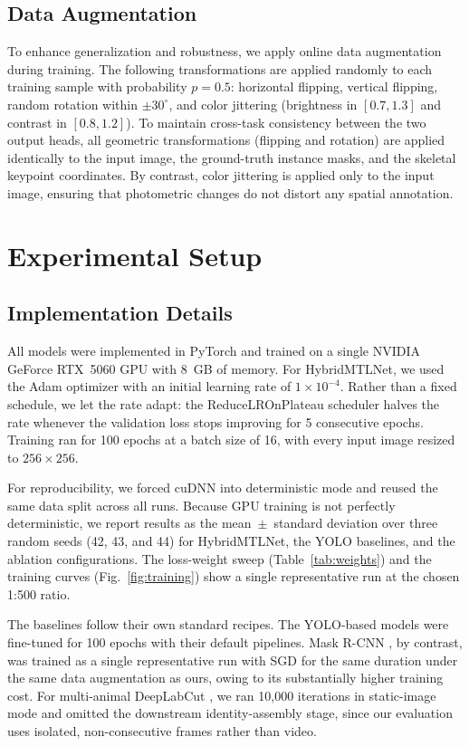\documentclass[runningheads]{llncs}
\begin{document}
\subsection{Data Augmentation}
To enhance generalization and robustness, we apply online data
augmentation during training. The following transformations are applied
randomly to each training sample with probability $p = 0.5$: horizontal
flipping, vertical flipping, random rotation within $\pm 30^\circ$, and
color jittering (brightness in $[0.7, 1.3]$ and contrast in
$[0.8, 1.2]$). To maintain cross-task consistency between the two output
heads, all geometric transformations (flipping and rotation) are applied
identically to the input image, the ground-truth instance masks, and the
skeletal keypoint coordinates. By contrast, color jittering is applied
only to the input image, ensuring that photometric changes do not
distort any spatial annotation.

\section{Experimental Setup}

\subsection{Implementation Details}
All models were implemented in PyTorch and trained on a single NVIDIA
GeForce RTX~5060 GPU with 8~GB of memory. For HybridMTLNet, we used
the Adam optimizer with an initial learning rate of $1 \times
10^{-4}$. Rather than a fixed schedule, we let the rate adapt: the
ReduceLROnPlateau scheduler halves the rate whenever the validation loss
stops improving for 5 consecutive epochs. Training ran for 100 epochs at a batch
size of 16, with every input image resized to $256 \times 256$.

For reproducibility, we forced cuDNN into deterministic mode and
reused the same data split across all runs. Because GPU training is
not perfectly deterministic, we report results as the mean~$\pm$~standard
deviation over three random seeds (42, 43, and 44) for HybridMTLNet, the
YOLO baselines, and the ablation configurations. The loss-weight sweep
(Table~\ref{tab:weights}) and the training curves
(Fig.~\ref{fig:training}) show a single representative run at the
chosen 1{:}500 ratio.

The baselines follow their own standard recipes. The YOLO-based models
\cite{jocher2026yolo26} were fine-tuned for 100 epochs with their
default pipelines. Mask R-CNN \cite{he2017maskrcnn}, by contrast, was trained as a single
representative run with SGD for the same duration under the same data
augmentation as ours, owing to its substantially higher training cost. For multi-animal DeepLabCut
\cite{mathis2018deeplabcut}, we ran 10{,}000 iterations in
static-image mode and omitted the downstream identity-assembly stage,
since our evaluation uses isolated, non-consecutive frames rather than
video.
\end{document}
